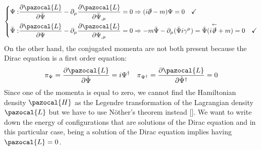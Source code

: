 \documentclass[../main.tex]{subfiles}
\begin{document}
\[
\left\{
\begin{aligned}
\Psi:&\frac{\partial\pazocal{L}}{\partial\bar{\Psi}}-\partial_\mu\frac{\partial\pazocal{L}}{\partial\bar{\Psi}_{,\mu}}=0\Rightarrow(i\slashed{\partial}-m)\Psi=0 \quad \checkmark\\
\bar{\Psi}:&\frac{\partial\pazocal{L}}{\partial\Psi}-\partial_\mu\frac{\partial\pazocal{L}}{\partial\Psi_{,\mu}}=0\Rightarrow -m\bar{\Psi}-\partial_\mu(\bar{\Psi}i\gamma^\mu)=\bar{\Psi}(i\overset{\leftarrow}{\slashed{\partial}}+m)=0 \quad \checkmark
\end{aligned}
\right.
\]
On the other hand, the conjugated momenta are not both present because the Dirac equation is a first order equation:
\[
\pi_\Psi=\frac{\partial\pazocal{L}}{\partial\Dot{\Psi}}=i\Psi^\dagger \quad \pi_{\Psi^\dagger}=\frac{\partial\pazocal{L}}{\partial\Dot{\Psi}^\dagger}=0
\]
Since one of the momenta is equal to zero, we cannot find the Hamiltonian density $\pazocal{H}$ as the Legendre transformation of the Lagrangian density $\pazocal{L}$ but we have to use N\"other's theorem instead []. We want to write down the energy of configurations that are solutions of the Dirac equation and in this particular case, being a solution of the Dirac equation implies having $\pazocal{L}=0$.
\end{document}
